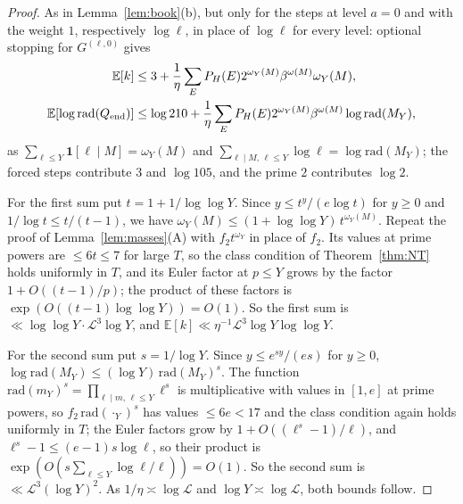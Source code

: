 \documentclass[11pt,reqno]{amsart}
\theoremstyle{definition}
\newcommand{\Lc}{\mathcal L}
\newcommand{\E}{\mathbb E}
\begin{document}
\begin{proof}
As in Lemma~\ref{lem:book}(b), but only for the steps at level $a=0$ and with
the weight $1$, respectively $\log\ell$, in place of $\log\ell$ for every level:
optional stopping for $G^{(\ell,0)}$ gives
\begin{align*}
 \E[k]&\le3+\frac1\eta\sum_EP_H(E)2^{\omega_Y(M)}\beta^{\omega(M)}\omega_Y(M),\\
 \E[\log\mathrm{rad}(Q_{\rm end})]&\le\log 210+\frac1\eta\sum_EP_H(E)2^{\omega_Y(M)}\beta^{\omega(M)}\log\mathrm{rad}(M_Y),
\end{align*}
as $\sum_{\ell\le Y}\mathbf 1[\ell\mid M]=\omega_Y(M)$ and $\sum_{\ell\mid M,\,\ell\le Y}\log\ell=\log\mathrm{rad}(M_Y)$; the
forced steps contribute $3$ and $\log105$, and the prime $2$ contributes $\log2$.

For the first sum put $t=1+1/\log\log Y$.  Since $y\le t^y/(e\log t)$ for $y\ge0$ and
$1/\log t\le t/(t-1)$, we have $\omega_Y(M)\le(1+\log\log Y)\,t^{\omega_Y(M)}$.  Repeat
the proof of Lemma~\ref{lem:masses}(A) with $f_2t^{\omega_Y}$ in place of $f_2$.  Its
values at prime powers are $\le6t\le7$ for large $T$, so the class condition of
Theorem~\ref{thm:NT} holds uniformly in $T$, and its Euler factor at $p\le Y$ grows
by the factor $1+O((t-1)/p)$; the product of these factors is
$\exp(O((t-1)\log\log Y))=O(1)$.  So the first sum is
$\ll\log\log Y\cdot\Lc^3\log Y$, and $\E[k]\ll\eta^{-1}\Lc^3\log Y\log\log Y$.

For the second sum put $s=1/\log Y$.  Since $y\le e^{sy}/(es)$ for $y\ge0$,
$\log\mathrm{rad}(M_Y)\le(\log Y)\,\mathrm{rad}(M_Y)^s$.  The function
$\mathrm{rad}(m_Y)^s=\prod_{\ell\mid m,\,\ell\le Y}\ell^s$ is multiplicative with values in
$[1,e]$ at prime powers, so $f_2\,\mathrm{rad}(\cdot_Y)^s$ has values $\le6e<17$ and the class
condition again holds uniformly in $T$; the Euler factors grow by
$1+O((\ell^s-1)/\ell)$, and $\ell^s-1\le(e-1)s\log\ell$, so their product is
$\exp(O(s\sum_{\ell\le Y}\log\ell/\ell))=O(1)$.  So the second sum is $\ll\Lc^3(\log Y)^2$.
As $1/\eta\asymp\log\Lc$ and $\log Y\asymp\log\Lc$, both bounds follow.
\end{proof}
\end{document}
